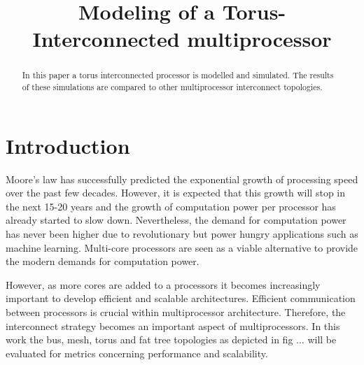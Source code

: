 \documentclass[journal,10pt,twoside, a4paper]{IEEEtran}
\begin{document}
\title{Modeling of a Torus-Interconnected multiprocessor}

\author{ 

}
\maketitle

\begin{abstract}
    In this paper a torus interconnected processor is modelled and simulated. The results of these simulations are compared to other multiprocessor interconnect topologies.
\end{abstract}
\section{Introduction}

Moore's law has successfully predicted the exponential growth of processing speed over the past few decades. However, it is expected that this growth will stop in the next 15-20 years and the growth of computation power per processor has already started to slow down. Nevertheless, the demand for computation power has never been higher due to revolutionary but power hungry applications such as machine learning. Multi-core processors are seen as a viable alternative to provide the modern demands for computation power.  

 However, as more cores are added to a processors it becomes increasingly important to develop efficient and scalable architectures.  Efficient communication between processors is crucial within multiprocessor architecture. Therefore, the interconnect strategy becomes an important aspect of multiprocessors. In this work the bus, mesh, torus and fat tree topologies as depicted in fig ... will be evaluated for metrics concerning performance and scalability.  
 
\end{document}
